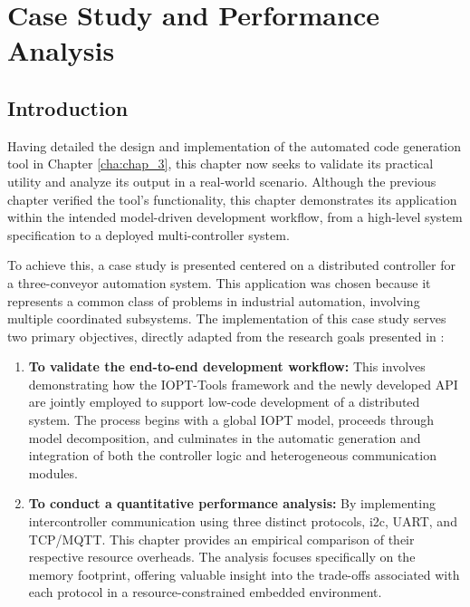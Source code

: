 
%


\chapter{Case Study and Performance Analysis}
\label{cha:case_study}


%

\section{Introduction}
\label{sec:case_study_intro}

Having detailed the design and implementation of the automated code generation tool in Chapter \ref{cha:chap_3}, this chapter now seeks to validate its practical utility and analyze its output in a real-world scenario. Although the previous chapter verified the tool's functionality, this chapter demonstrates its application within the intended model-driven development workflow, from a high-level system specification to a deployed multi-controller system.

To achieve this, a case study is presented centered on a distributed controller for a three-conveyor automation system. This application was chosen because it represents a common class of problems in industrial automation, involving multiple coordinated subsystems. The implementation of this case study serves two primary objectives, directly adapted from the research goals presented in \cite{tavaresgomes2026}:

\begin{enumerate}
    \item \textbf{To validate the end-to-end development workflow:} This involves demonstrating how the IOPT-Tools framework and the newly developed API are jointly employed to support low-code development of a distributed system. The process begins with a global IOPT model, proceeds through model decomposition, and culminates in the automatic generation and integration of both the controller logic and heterogeneous communication modules.
    
    \item \textbf{To conduct a quantitative performance analysis:} By implementing intercontroller communication using three distinct protocols, \gls{i2c}, UART, and TCP/MQTT. This chapter provides an empirical comparison of their respective resource overheads. The analysis focuses specifically on the memory footprint, offering valuable insight into the trade-offs associated with each protocol in a resource-constrained embedded environment.
\end{enumerate}

